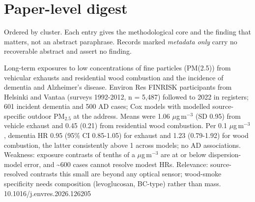 \documentclass[10pt]{article}
\begin{document}
\vspace{4mm}

\par{}\baselineskip{}\baselineskip
\section*{\sffamily\bfseries\color{Deep}Paper-level digest}
\vspace{-1.5mm}{\color{Amber}\rule{\linewidth}{1.1pt}}\vspace{2.5mm}

{\fontsize{7.4}{9}\selectfont\color{Slate}Ordered by cluster. Each entry gives the
methodological core and the finding that matters, not an abstract paraphrase. Records
marked \textit{metadata only} carry no recoverable abstract and assert no finding.\par}


{Long-term exposures to low concentrations of fine particles (PM(2.5)) from vehicular exhausts and residential wood combustion and the incidence of dementia and Alzheimer's disease.}
{Environ Res}
{FINRISK participants from Helsinki and Vantaa (surveys 1992-2012, n = 5,487) followed to 2022 in registers; 601 incident dementia and 500 AD cases; Cox models with modelled source-specific outdoor PM$_{2.5}$ at the address. Means were 1.06 $\mu$g\,m$^{-3}$ (SD 0.95) from vehicle exhaust and 0.45 (0.21) from residential wood combustion. Per 0.1 $\mu$g\,m$^{-3}$, dementia HR 0.95 (95\% CI 0.85-1.05) for exhaust and 1.23 (0.79-1.92) for wood combustion, the latter consistently above 1 across models; no AD associations. Weakness: exposure contrasts of tenths of a $\mu$g\,m$^{-3}$ are at or below dispersion-model error, and \textasciitilde{}600 cases cannot resolve modest HRs. Relevance: source-resolved contrasts this small are beyond any optical sensor; wood-smoke specificity needs composition (levoglucosan, BC-type) rather than mass.}
{10.1016/j.envres.2026.126205}
\end{document}

